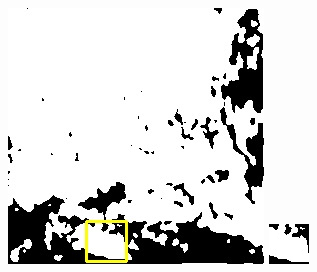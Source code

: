 \documentclass[10pt]{ctexart}
\begin{document}
\begin{multicols}{2}
\begin{figure}[H]
{\begin{minipage}[b]{0.15\linewidth}
            \includegraphics[width=1\linewidth]{../log/spoon2/cut2/LC81620432014072LGN00_16237_unet.jpg}\vspace{4pt}
            \includegraphics[width=1\linewidth]{../log/spoon2/cut2/tmp_cut_LC81620432014072LGN00_16237_unet.jpg}\vspace{4pt}

\end{minipage}}
\end{figure}
\end{multicols}
\end{document}
